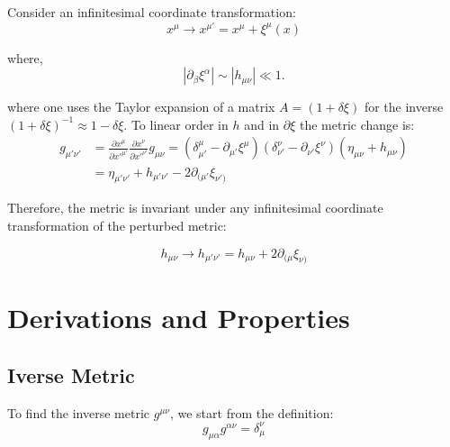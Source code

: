 Consider an infinitesimal coordinate transformation:
\begin{equation}
    x^{\mu} \rightarrow x^{\mu '} = x^{\mu} + \xi^{\mu}(x)\label{eq:infinitesimal-diffeomorphism}
\end{equation}

where,
\begin{equation}
    |\partial_{\beta}\xi^\alpha| \sim |h_{\mu\nu}| \ll 1.\label{eq:infinitesimal-diffeomorphism-condition}
\end{equation}

where one uses the Taylor expansion of a matrix $A = (1 + \delta \xi)$ for the inverse $(1 + \delta \xi)^{-1}\approx 1 - \delta \xi$.
To linear order in $h$ and in $\partial \xi$ the metric change is:
\begin{align}
    g_{\mu'\nu'} &= \frac{\partial x^{\mu}}{\partial x'^{\mu'}} \frac{\partial x^{\nu}}{\partial x'^{\nu'}} g_{\mu\nu} \nonumber  = (\delta^\mu_{\mu'} - \partial_{\mu'}\xi^\mu)(\delta^\nu_{\nu'} - \partial_{\nu'}\xi^\nu)(\eta_{\mu\nu} + h_{\mu\nu}) \nonumber \\
    & = \eta_{\mu'\nu'} + h_{\mu'\nu'} - 2\partial_{(\mu'}\xi_{\nu')}\label{eq:metric-transformation-infinitesimal-diffeomorphism}
\end{align}

Therefore, the metric is invariant under any infinitesimal coordinate transformation of the perturbed metric:

\begin{equation}
    \boxed{
        h_{\mu\nu} \rightarrow h_{\mu'\nu'} = h_{\mu\nu} +2\partial_{(\mu}\xi_{\nu)}
    }\label{eq:invariance-under-infinitesimal-diffeomorphism}
\end{equation}


\section{Derivations and Properties}\label{sec:derivations-and-properties}

\subsection{Iverse Metric}\label{subsec:iverse-metric}
To find the inverse metric $g^{\mu\nu}$, we start from the definition:
\begin{equation}
    g_{\mu\alpha} g^{\alpha\nu} = \delta_{\mu}^{\nu}\label{eq:inverse-metric-definition}
\end{equation}

